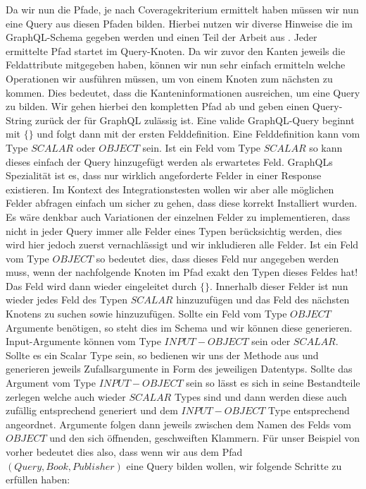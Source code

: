 Da wir nun die Pfade, je nach Coveragekriterium ermittelt haben müssen wir nun eine Query aus diesen Pfaden bilden.
Hierbei nutzen wir diverse Hinweise die im GraphQL-Schema gegeben werden und einen Teil der Arbeit aus \cite[Property-Based Testing]{property-based-testing}.
Jeder ermittelte Pfad startet im Query-Knoten.
Da wir zuvor den Kanten jeweils die Feldattribute mitgegeben haben, können wir nun sehr einfach ermitteln welche
Operationen wir ausführen müssen, um von einem Knoten zum nächsten zu kommen.
Dies bedeutet, dass die Kanteninformationen ausreichen, um eine Query zu bilden.
Wir gehen hierbei den kompletten Pfad ab und geben einen Query-String zurück der für GraphQL zulässig ist.
Eine valide GraphQL-Query beginnt mit $\{ \}$ und folgt dann mit der ersten Felddefinition.
Eine Felddefinition kann vom Type $SCALAR$ oder $OBJECT$ sein.
Ist ein Feld vom Type $SCALAR$ so kann dieses einfach der Query hinzugefügt werden als erwartetes Feld.
GraphQLs Spezialität ist es, dass nur wirklich angeforderte Felder in einer Response existieren.
Im Kontext des Integrationstesten wollen wir aber alle möglichen Felder abfragen einfach um sicher zu gehen, dass
diese korrekt Installiert wurden.
Es wäre denkbar auch Variationen der einzelnen Felder zu implementieren, dass nicht in jeder Query immer alle Felder
eines Typen berücksichtig werden, dies wird hier jedoch zuerst vernachlässigt und wir inkludieren alle Felder.
Ist ein Feld vom Type $OBJECT$ so bedeutet dies, dass dieses Feld nur angegeben werden muss, wenn der nachfolgende Knoten im Pfad
exakt den Typen dieses Feldes hat!
Das Feld wird dann wieder eingeleitet durch $\{ \}$.
Innerhalb dieser Felder ist nun wieder jedes Feld des Typen $SCALAR$ hinzuzufügen und das Feld des nächsten Knotens zu suchen sowie hinzuzufügen.
Sollte ein Feld vom Type $OBJECT$ Argumente benötigen, so steht dies im Schema und wir können diese generieren.
Input-Argumente können vom Type $INPUT-OBJECT$ sein oder $SCALAR$.
Sollte es ein Scalar Type sein, so bedienen wir uns der Methode aus \cite[Property-based Testing]{property-based-testing} und generieren
jeweils Zufallsargumente in Form des jeweiligen Datentyps.
Sollte das Argument vom Type $INPUT-OBJECT$ sein so lässt es sich in seine Bestandteile zerlegen welche auch wieder $SCALAR$ Types sind und
dann werden diese auch zufällig entsprechend generiert und dem $INPUT-OBJECT$ Type entsprechend angeordnet.
Argumente folgen dann jeweils zwischen dem Namen des Felds vom $OBJECT$ und den sich öffnenden, geschweiften Klammern.
Für unser Beispiel von vorher bedeutet dies also, dass wenn wir aus dem Pfad $(Query, Book, Publisher)$ eine Query bilden wollen, wir folgende
Schritte zu erfüllen haben:

